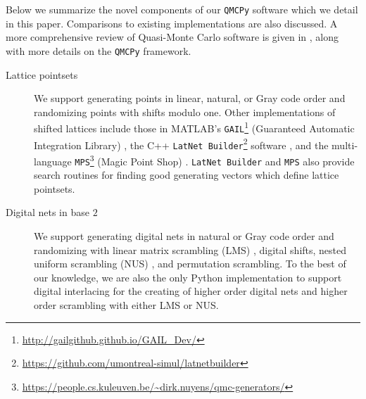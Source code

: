 \documentclass[acmsmall]{acmart}
\begin{document}
Below we summarize the novel components of our \texttt{QMCPy} software which we detail in this paper. Comparisons to existing implementations are also discussed. A more comprehensive review of Quasi-Monte Carlo software is given in \citep{choi.QMC_software}, along with more details on the \texttt{QMCPy} framework. 
\begin{description}
    \item[Lattice pointsets] We support generating points in linear, natural, or Gray code order and randomizing points with shifts modulo one. Other implementations of shifted lattices include those in MATLAB's \texttt{GAIL}\footnote{\url{http://gailgithub.github.io/GAIL_Dev/}} (Guaranteed Automatic Integration Library) \citep{GAIL.software,hickernell2018monte}, the C++ \texttt{LatNet Builder}\footnote{\url{https://github.com/umontreal-simul/latnetbuilder}} software \citep{LatNetBuilder.software}, and the multi-language \texttt{MPS}\footnote{\url{https://people.cs.kuleuven.be/~dirk.nuyens/qmc-generators/}} (Magic Point Shop) \citep{MagicPointShop.software}. \texttt{LatNet Builder} and \texttt{MPS} also provide search routines for finding good generating vectors which define lattice pointsets.
    \item[Digital nets in base $2$] We support generating digital nets in natural or Gray code order and randomizing with linear matrix scrambling (LMS) \citep{owen.variance_alternative_scrambles_digital_net}, digital shifts, nested uniform scrambling (NUS) \citep{owen1995randomly}, and permutation scrambling. To the best of our knowledge, we are also the only Python implementation to support digital interlacing for the creating of higher order digital nets and higher order scrambling with either LMS or NUS. 
    

\end{description}
\end{document}
